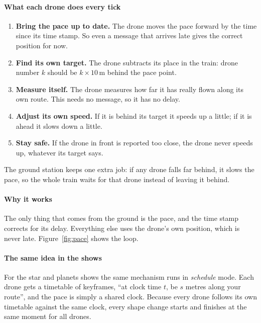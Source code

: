 \documentclass[11pt,a4paper,oneside]{report}
\begin{document}
\paragraph{What each drone does every tick}
\begin{enumerate}
  \item \textbf{Bring the pace up to date.} The drone moves the pace forward by the time since its
        time stamp. So even a message that arrives late gives the correct position for now.
  \item \textbf{Find its own target.} The drone subtracts its place in the train: drone number
        $k$ should be $k\times10$\,m behind the pace point.
  \item \textbf{Measure itself.} The drone measures how far it has really flown along its own
        route. This needs no message, so it has no delay.
  \item \textbf{Adjust its own speed.} If it is behind its target it speeds up a little; if it is
        ahead it slows down a little.
  \item \textbf{Stay safe.} If the drone in front is reported too close, the drone never speeds
        up, whatever its target says.
\end{enumerate}
The ground station keeps one extra job: if any drone falls far behind, it slows the pace, so the
whole train waits for that drone instead of leaving it behind.

\paragraph{Why it works}
The only thing that comes from the ground is the pace, and the time stamp corrects for its delay.
Everything else uses the drone's own position, which is never late. Figure~\ref{fig:pace} shows
the loop.

\paragraph{The same idea in the shows}
For the star and planets shows the same mechanism runs in \emph{schedule} mode. Each drone gets a
timetable of keyframes, ``at clock time $t$, be $s$ metres along your route'', and the pace is
simply a shared clock. Because every drone follows its own timetable against the same clock,
every shape change starts and finishes at the same moment for all drones.
\end{document}
